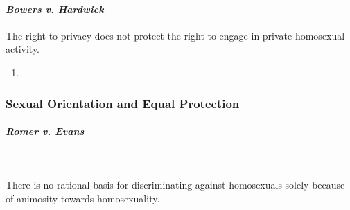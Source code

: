 \paragraph{\emph{Bowers v. Hardwick}}

The right to privacy does not protect the right to engage in private 
homosexual activity.

\begin{enumerate}
    \item %
\end{enumerate}
 
\subsubsection{Sexual Orientation and Equal Protection}

\paragraph{\emph{Romer v. Evans}}
~\\\\
There is no rational basis for discriminating against homosexuals solely 
because of animosity towards homosexuality.

